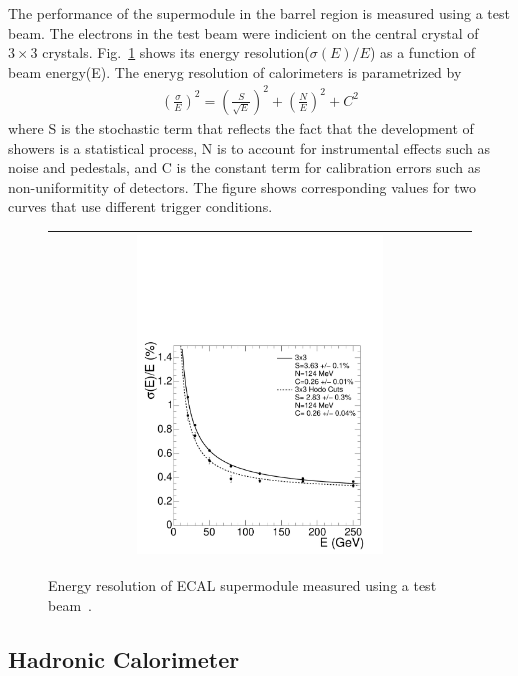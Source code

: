 The performance of the supermodule in the barrel region is measured 
using a test beam. The electrons in the test beam were indicient on 
the central crystal of $3\times 3$ crystals.
Fig.~\ref{fig:ecal_res} shows its energy resolution($\sigma(E)/E$)
as a function of beam energy(E). The eneryg resolution of calorimeters is 
parametrized by 
\begin{eqnarray}
\left( \frac{\sigma}{E} \right)^2 
= 
\left( \frac{S}{\sqrt{E}}  \right)^2 + \left( \frac{N}{E} \right)^2 + C^2
\end{eqnarray} 
where S is the stochastic term that reflects the fact that the development of showers is    
a statistical process, N is to account for instrumental effects such as noise and pedestals, 
and C is the constant term for calibration errors such as non-uniformitity of detectors.  
The figure shows corresponding values for two curves that use different trigger 
conditions. 

%
\begin{figure}[h] 
\vspace{1cm}
\centering 
\begin{tabular}{|c|} 
\hline
\includegraphics[width=0.6\textwidth]{figures/Figure_001-007.pdf}\\
\hline
\end{tabular} 
\caption{Energy resolution of ECAL supermodule measured using a test beam~\cite{cmstdr1}.}
\label{fig:ecal_res} 
\end{figure} 


\subsection{Hadronic Calorimeter} 

